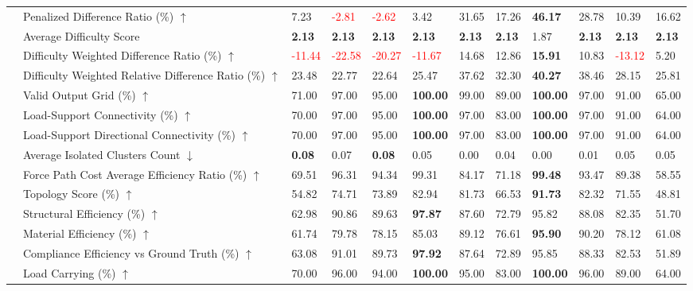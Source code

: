 \begin{table}[!h]
{\begin{tabular}{llllllllllll}
 & Penalized Difference Ratio (\%) $\uparrow$ & 7.23 & \textcolor{red}{-2.81} & \textcolor{red}{-2.62} & 3.42 & 31.65 & 17.26 & \textbf{46.17} & 28.78 & 10.39 & 16.62 \\
 & Average Difficulty Score & \textbf{2.13} & \textbf{2.13} & \textbf{2.13} & \textbf{2.13} & \textbf{2.13} & \textbf{2.13} & 1.87 & \textbf{2.13} & \textbf{2.13} & \textbf{2.13} \\
 & Difficulty Weighted Difference Ratio (\%) $\uparrow$ & \textcolor{red}{-11.44} & \textcolor{red}{-22.58} & \textcolor{red}{-20.27} & \textcolor{red}{-11.67} & 14.68 & 12.86 & \textbf{15.91} & 10.83 & \textcolor{red}{-13.12} & 5.20 \\
 & Difficulty Weighted Relative Difference Ratio (\%) $\uparrow$ & 23.48 & 22.77 & 22.64 & 25.47 & 37.62 & 32.30 & \textbf{40.27} & 38.46 & 28.15 & 25.81 \\
 & Valid Output Grid (\%) $\uparrow$ & 71.00 & 97.00 & 95.00 & \textbf{100.00} & 99.00 & 89.00 & \textbf{100.00} & 97.00 & 91.00 & 65.00 \\
 & Load-Support Connectivity (\%) $\uparrow$ & 70.00 & 97.00 & 95.00 & \textbf{100.00} & 97.00 & 83.00 & \textbf{100.00} & 97.00 & 91.00 & 64.00 \\
 & Load-Support Directional Connectivity (\%) $\uparrow$ & 70.00 & 97.00 & 95.00 & \textbf{100.00} & 97.00 & 83.00 & \textbf{100.00} & 97.00 & 91.00 & 64.00 \\
 & Average Isolated Clusters Count $\downarrow$ & \textbf{0.08} & 0.07 & \textbf{0.08} & 0.05 & 0.00 & 0.04 & 0.00 & 0.01 & 0.05 & 0.05 \\
 & Force Path Cost Average Efficiency Ratio (\%) $\uparrow$ & 69.51 & 96.31 & 94.34 & 99.31 & 84.17 & 71.18 & \textbf{99.48} & 93.47 & 89.38 & 58.55 \\
 & Topology Score (\%) $\uparrow$ & 54.82 & 74.71 & 73.89 & 82.94 & 81.73 & 66.53 & \textbf{91.73} & 82.32 & 71.55 & 48.81 \\
 & Structural Efficiency (\%) $\uparrow$ & 62.98 & 90.86 & 89.63 & \textbf{97.87} & 87.60 & 72.79 & 95.82 & 88.08 & 82.35 & 51.70 \\
 & Material Efficiency (\%) $\uparrow$ & 61.74 & 79.78 & 78.15 & 85.03 & 89.12 & 76.61 & \textbf{95.90} & 90.20 & 78.12 & 61.08 \\
 & Compliance Efficiency vs Ground Truth (\%) $\uparrow$ & 63.08 & 91.01 & 89.73 & \textbf{97.92} & 87.64 & 72.89 & 95.85 & 88.33 & 82.53 & 51.89 \\
 & Load Carrying (\%) $\uparrow$ & 70.00 & 96.00 & 94.00 & \textbf{100.00} & 95.00 & 83.00 & \textbf{100.00} & 96.00 & 89.00 & 64.00 \\

\end{tabular}}
\end{table}
